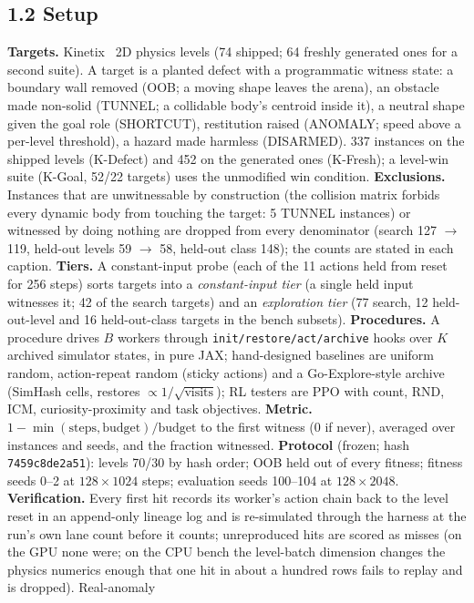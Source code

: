 \subsection*{1.2 Setup}
\textbf{Targets.} Kinetix~\cite{kinetix} 2D physics levels (74 shipped; 64 freshly generated ones for a second suite). A target is a
planted defect with a programmatic witness state: a boundary wall removed (OOB; a moving shape leaves the arena), an obstacle made
non-solid (TUNNEL; a collidable body's centroid inside it), a neutral shape given the goal role (SHORTCUT), restitution raised
(ANOMALY; speed above a per-level threshold), a hazard made harmless (DISARMED). 337 instances on the shipped levels (K-Defect) and 452 on the
generated ones (K-Fresh); a level-win suite (K-Goal, 52/22 targets) uses the unmodified win condition. \textbf{Exclusions.} Instances that are
unwitnessable by construction (the collision matrix forbids every dynamic body from touching the target: 5 TUNNEL instances) or witnessed by
doing nothing are dropped from every denominator (search 127 $\to$ 119, held-out levels 59 $\to$ 58, held-out class 148); the counts are
stated in each caption. \textbf{Tiers.} A constant-input probe (each of the 11 actions held from reset for 256 steps) sorts targets into a
\emph{constant-input tier} (a single held input witnesses it; 42 of the search targets) and an \emph{exploration tier} (77 search, 12 held-out-level
and 16 held-out-class targets in the bench subsets). \textbf{Procedures.} A procedure drives $B$ workers through \texttt{init/restore/act/archive}
hooks over $K$ archived simulator states, in pure JAX; hand-designed baselines are uniform random, action-repeat random (sticky
actions) and a Go-Explore-style archive (SimHash cells, restores $\propto 1/\sqrt{\text{visits}}$); RL testers are PPO with count,
RND, ICM, curiosity-proximity and task objectives. \textbf{Metric.} $1-\min(\text{steps},\text{budget})/\text{budget}$ to the first witness
(0 if never), averaged over instances and seeds, and the fraction witnessed. \textbf{Protocol} (frozen; hash \texttt{7459c8de2a51}): levels 70/30
by hash order; OOB held out of every fitness; fitness seeds 0--2 at $128\times1024$ steps; evaluation seeds 100--104 at $128\times2048$.
\textbf{Verification.} Every first hit records its worker's action chain back to the level reset in an append-only lineage log and is
re-simulated through the harness at the run's own lane count before it counts; unreproduced hits are scored as misses (on the GPU none were; on the CPU bench the level-batch dimension changes the physics numerics enough that one hit in about a hundred rows fails to replay and is dropped). Real-anomaly
